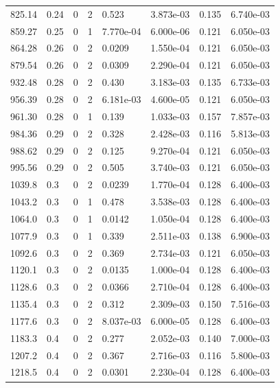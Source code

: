 \documentclass[preview]{standalone}
\begin{document}
{{{\begin{tabular}{L{1.2cm}C{1.2cm} C{0.3cm}C{0.5cm} C{1.4cm}C{1.4cm} C{1.4cm}C{1.4cm}}
  825.14  &  0.24  & 0     &  2 &  0.523  & 3.873e-03  & 0.135 &  6.740e-03   \\ 
  859.27  &  0.25  & 0     &  1 &  7.770e-04  & 6.000e-06  & 0.121 &  6.050e-03   \\ 
  864.28  &  0.26  & 0     &  2 &  0.0209  & 1.550e-04  & 0.121 &  6.050e-03   \\ 
  879.54  &  0.26  & 0     &  2 &  0.0309  & 2.290e-04  & 0.121 &  6.050e-03   \\ 
  932.48  &  0.28  & 0     &  2 &  0.430  & 3.183e-03  & 0.135 &  6.733e-03   \\ 
  956.39  &  0.28  & 0     &  2 &  6.181e-03  & 4.600e-05  & 0.121 &  6.050e-03   \\ 
  961.30  &  0.28  & 0     &  1 &  0.139  & 1.033e-03  & 0.157 &  7.857e-03   \\ 
  984.36  &  0.29  & 0     &  2 &  0.328  & 2.428e-03  & 0.116 &  5.813e-03   \\ 
  988.62  &  0.29  & 0     &  2 &  0.125  & 9.270e-04  & 0.121 &  6.050e-03   \\ 
  995.56  &  0.29  & 0     &  2 &  0.505  & 3.740e-03  & 0.121 &  6.050e-03   \\ 
  1039.8  &   0.3  & 0     &  2 &  0.0239  & 1.770e-04  & 0.128 &  6.400e-03   \\ 
  1043.2  &   0.3  & 0     &  1 &  0.478  & 3.538e-03  & 0.128 &  6.400e-03   \\ 
  1064.0  &   0.3  & 0     &  1 &  0.0142  & 1.050e-04  & 0.128 &  6.400e-03   \\ 
  1077.9  &   0.3  & 0     &  1 &  0.339  & 2.511e-03  & 0.138 &  6.900e-03   \\ 
  1092.6  &   0.3  & 0     &  2 &  0.369  & 2.734e-03  & 0.121 &  6.050e-03   \\ 
  1120.1  &   0.3  & 0     &  2 &  0.0135  & 1.000e-04  & 0.128 &  6.400e-03   \\ 
  1128.6  &   0.3  & 0     &  2 &  0.0366  & 2.710e-04  & 0.128 &  6.400e-03   \\ 
  1135.4  &   0.3  & 0     &  2 &  0.312  & 2.309e-03  & 0.150 &  7.516e-03   \\ 
  1177.6  &   0.3  & 0     &  2 &  8.037e-03  & 6.000e-05  & 0.128 &  6.400e-03   \\ 
  1183.3  &   0.4  & 0     &  2 &  0.277  & 2.052e-03  & 0.140 &  7.000e-03   \\ 
  1207.2  &   0.4  & 0     &  2 &  0.367  & 2.716e-03  & 0.116 &  5.800e-03   \\ 
  1218.5  &   0.4  & 0     &  2 &  0.0301  & 2.230e-04  & 0.128 &  6.400e-03   \\ 

\end{tabular}}}}
\end{document}
